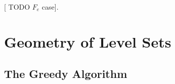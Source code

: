 \documentclass{article} %
\newcommand {\Fem} {F_{e}}
\newcommand {\Forr} {F_{o}}
\newcommand{\Exp}[1]{\mathbb{E}\left(#1 \right)}
\newtheorem{theorem}{Theorem}[section]
\newtheorem{lemma}[theorem]{Lemma}
\begin{document}
%



[ TODO  $\Fem$ case]. 





\section{Geometry of Level Sets}
\label{sec:QuanNoncon}

\subsection{The Greedy Algorithm}
\label{sec:GreedyAlg}
\end{document}
